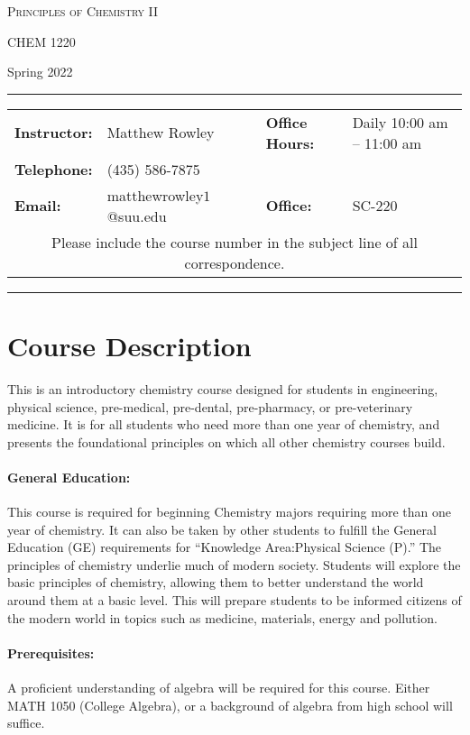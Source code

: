 \documentclass[12pt, letterpaper]{article}
\begin{document}
\begin{center}
	{\Large \textsc{Principles of Chemistry II}}

	CHEM 1220
\end{center}
\begin{center}
	{\large Spring 2022}
\end{center}
\begin{center}
	\rule{0.99\textwidth}{0.4pt}
	\begin{tabular}{llcll}
		\textbf{Instructor:} & Matthew Rowley           &  & \textbf{Office Hours:} & Daily 10:00 am -- 11:00 am \\
		\textbf{Telephone:}  & (435) 586-7875           &  &                        &                            \\
		\textbf{Email:}      & matthewrowley$1$@suu.edu &  & \textbf{Office:}       & SC-220                     \\
		\multicolumn{5}{c}{Please include the course number in the subject line of all correspondence.}
	\end{tabular}
	\rule{0.99\textwidth}{0.4pt}
\end{center}

\section*{Course Description}
This is an introductory chemistry course designed for students in engineering, physical science, pre-medical, pre-dental, pre-pharmacy, or pre-veterinary medicine. It is for all students who need more than one year of chemistry, and presents the foundational principles on which all other chemistry courses build.

\paragraph{General Education:}
This course is required for beginning Chemistry majors requiring more than one year of chemistry. It can also be taken by other students to fulfill the General Education (GE) requirements for ``Knowledge Area:Physical Science (P).'' The principles of chemistry underlie much of modern society. Students will explore the basic principles of chemistry, allowing them to better understand the world around them at a basic level. This will prepare students to be informed citizens of the modern world in topics such as medicine, materials, energy and pollution.

\paragraph{Prerequisites:}
A proficient understanding of algebra will be required for this course. Either MATH 1050 (College Algebra), or a background of algebra from high school will suffice.
\end{document}
